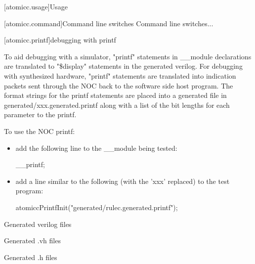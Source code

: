 [atomicc.usage]{Usage}

[atomicc.command]{Command line switches}
Command line switches...

[atomicc.printf]{debugging with printf}

To aid debugging with a simulator, "printf" statements in __module declarations are
translated to "\$display" statements in the generated verilog.
For debugging with synthesized hardware, "printf" statements are translated into
indication packets sent through the NOC back to the software side host program.
The format strings for the printf statements are placed into a generated file
in generated/xxx.generated.printf along with a list of the bit lengths for each
parameter to the printf.

\begin{bnf}
\br
\end{bnf}

To use the NOC printf:
\begin{itemize}
\item add the following line to the __module being tested:
\begin{codeblock}
     __printf;
\end{codeblock}
\item add a line similar to the following (with the 'xxx' replaced) to the test program:
\begin{codeblock}
     atomiccPrintfInit("generated/rulec.generated.printf");
\end{codeblock}
\end{itemize}


Generated verilog files

Generated .vh files

Generated .h files
